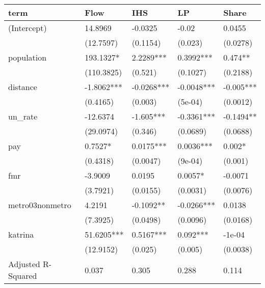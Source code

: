 \documentclass[]{article}
\begin{document}
\clearpage

\begin{longtable}[]{@{}lllll@{}}
\toprule
term & Flow & IHS & LP & Share\tabularnewline
\midrule
\endhead
(Intercept) & 14.8969 & -0.0325 & -0.02 & 0.0455\tabularnewline
& (12.7597) & (0.1154) & (0.023) & (0.0278)\tabularnewline
population & 193.1327* & 2.2289*** & 0.3992*** & 0.474**\tabularnewline
& (110.3825) & (0.521) & (0.1027) & (0.2188)\tabularnewline
distance & -1.8062*** & -0.0268*** & -0.0048*** &
-0.005***\tabularnewline
& (0.4165) & (0.003) & (5e-04) & (0.0012)\tabularnewline
un\_rate & -12.6374 & -1.605*** & -0.3361*** & -0.1494**\tabularnewline
& (29.0974) & (0.346) & (0.0689) & (0.0688)\tabularnewline
pay & 0.7527* & 0.0175*** & 0.0036*** & 0.002*\tabularnewline
& (0.4318) & (0.0047) & (9e-04) & (0.001)\tabularnewline
fmr & -3.9009 & 0.0195 & 0.0057* & -0.0071\tabularnewline
& (3.7921) & (0.0155) & (0.0031) & (0.0076)\tabularnewline
metro03nonmetro & 4.2191 & -0.1092** & -0.0266*** &
0.0138\tabularnewline
& (7.3925) & (0.0498) & (0.0096) & (0.0168)\tabularnewline
katrina & 51.6205*** & 0.5167*** & 0.092*** & -1e-04\tabularnewline
& (12.9152) & (0.025) & (0.005) & (0.0038)\tabularnewline
Adjusted R-Squared & 0.037 & 0.305 & 0.288 & 0.114\tabularnewline
\bottomrule
\end{longtable}

\clearpage
\end{document}
